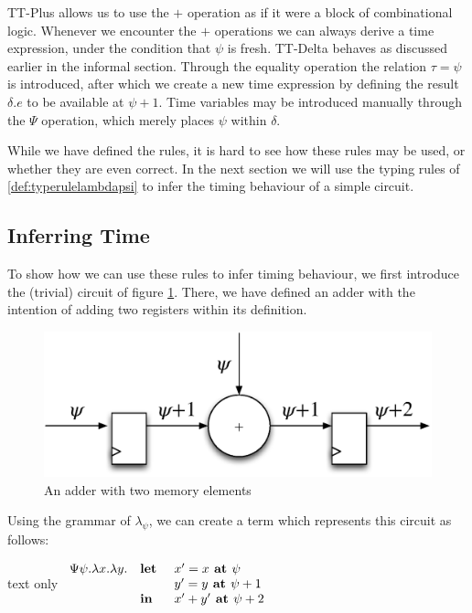 TT-Plus allows us to use the $+$ operation as if it were a block of combinational logic.
Whenever we encounter the $+$ operations we can always derive a time expression, under the condition that $\psi$ is fresh.
TT-Delta behaves as discussed earlier in the informal section. 
Through the equality operation the relation $\tau = \psi$ is introduced, after which we create a new time expression by defining the result $\delta.e$ to be available at $\psi + 1$.
Time variables may be introduced manually through the $\Psi$ operation, which merely places $\psi$ within $\delta$.

While we have defined the rules, it is hard to see how these rules may be used, or whether they are even correct.
In the next section we will use the typing rules of \ref{def:typerulelambdapsi} to infer the timing behaviour of a simple circuit.

\subsection{Inferring Time}
To show how we can use these rules to infer timing behaviour, we first introduce the (trivial) circuit of figure \ref{fig:addcomp}.
There, we have defined an adder with the intention of adding two registers within its definition.

\begin{figure}[h]
\centering
\includegraphics[width=0.8\linewidth]{images/addcomp}
\caption{An adder with two memory elements}
\label{fig:addcomp}
\end{figure}

Using the grammar of $\lambda_\psi$, we can create a term which represents this circuit as follows:
\begin{changemargin}{1cm}{0cm}
\begin{expansionno}{text only}
$
\begin{array}{l l l} 
\Psi \psi. \lambda x.\lambda y. & \textbf{let } & x' = x \textbf{ at } \psi\\ 
                                &     & y' = y \textbf{ at } \psi+1\\
                                & \textbf{in }  & x' + y' \textbf{ at } \psi + 2
\end{array}$
\end{expansionno}
\end{changemargin}


